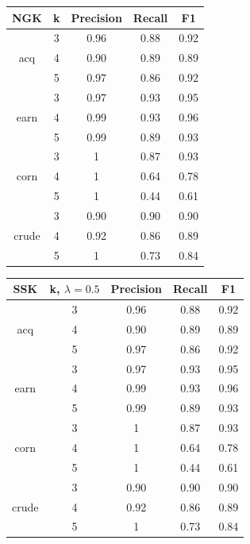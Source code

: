 \begin{tabular}{ c | c | c | c | c | }
	NGK & k & Precision & Recall & F1   \\ \hline	
	 & 3 & 0.96 & 0.88 & 0.92     \\ 
	acq & 4 & 0.90 & 0.89 &  0.89    \\
	 & 5 & 0.97 & 0.86 & 0.92     \\ \hline
	 & 3 & 0.97 & 0.93 &  0.95    \\ 
	earn & 4 & 0.99 & 0.93 &  0.96    \\ 
	 & 5 & 0.99 & 0.89 &  0.93    \\ \hline
	 & 3 & 1 & 0.87 & 0.93     \\ 
	corn & 4 & 1 & 0.64 & 0.78     \\ 
	 & 5 & 1 & 0.44 &  0.61    \\ \hline
	 & 3 & 0.90 & 0.90 &  0.90    \\ 
	crude & 4 & 0.92 & 0.86 & 0.89     \\ 
	 & 5 & 1 & 0.73 &  0.84    \\ \hline
\end{tabular}
\begin{tabular}{ c | c | c | c | c | }
	SSK & k, $ \lambda = 0.5 $ & Precision & Recall & F1   \\ \hline	
	& 3 & 0.96 & 0.88 & 0.92     \\ 
	acq & 4 & 0.90 & 0.89 &  0.89    \\
	& 5 & 0.97 & 0.86 & 0.92     \\ \hline
	& 3 & 0.97 & 0.93 &  0.95    \\ 
	earn & 4 & 0.99 & 0.93 &  0.96    \\ 
	& 5 & 0.99 & 0.89 &  0.93    \\ \hline
	& 3 & 1 & 0.87 & 0.93     \\ 
	corn & 4 & 1 & 0.64 & 0.78     \\ 
	& 5 & 1 & 0.44 &  0.61    \\ \hline
	& 3 & 0.90 & 0.90 &  0.90    \\ 
	crude & 4 & 0.92 & 0.86 & 0.89     \\ 
	& 5 & 1 & 0.73 &  0.84    \\ \hline
\end{tabular}

